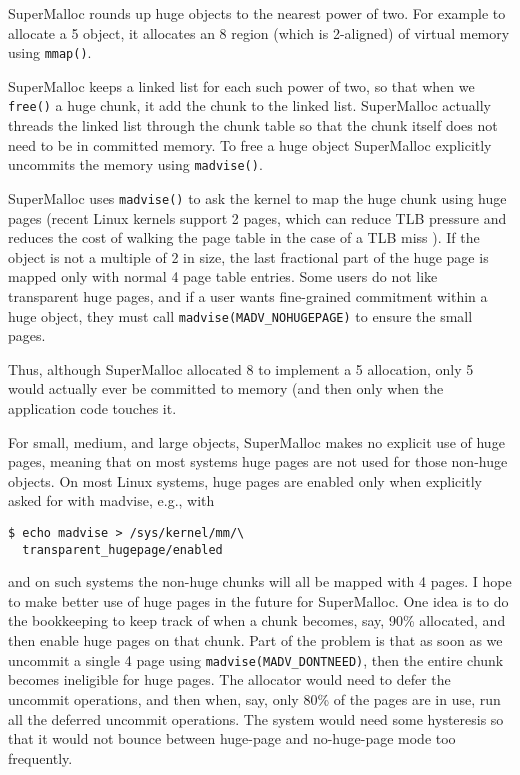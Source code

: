 \documentclass[natbib,sort&compress,10pt]{sigplanconf}
\newcommand{\code}[1]{\texttt{#1}}
\begin{document}
SuperMalloc rounds up huge objects to the nearest power of two.  For
example to allocate a \unit{5}\mebi\byte{} object, it allocates an
\unit{8}\mebi\byte{} region (which is \unit{2}\mebi\byte{}-aligned) of
virtual memory using \code{mmap()}.

SuperMalloc keeps a linked list for each such power of two, so that
when we \code{free()} a huge chunk, it add the chunk to the linked
list.  SuperMalloc actually threads the linked list through the chunk
table so that the chunk itself does not need to be in committed
memory.  To free a huge object SuperMalloc explicitly uncommits the
memory using \code{madvise()}.

SuperMalloc uses \code{madvise()} to ask the kernel to map the huge
chunk using huge pages (recent Linux kernels support
\unit{2}\mebi\byte{} pages, which can reduce TLB pressure and reduces
the cost of walking the page table in the case of a TLB miss
\cite{Corbet11}).  If the object is not a multiple of
\unit{2}\mebi\byte{} in size, the last fractional part of the huge
page is mapped only with normal \unit{4}\kibi\byte{} page table entries.
Some users do not like transparent huge pages, and if a user wants
fine-grained commitment within a huge object, they must call
\code{madvise(MADV\_NOHUGEPAGE)} to ensure the small pages.

Thus, although SuperMalloc allocated \unit{8}\mebi\byte{} to implement
a \unit{5}\mebi\byte{} allocation, only \unit{5}\mebi\byte{} would
actually ever be committed to memory (and then only when the
application code touches it.

For small, medium, and large objects, SuperMalloc makes no explicit
use of huge pages, meaning that on most systems huge pages are not
used for those non-huge objects.  On most Linux systems, huge pages are enabled
only when explicitly asked for with madvise, e.g., with
\begin{verbatim}
$ echo madvise > /sys/kernel/mm/\
  transparent_hugepage/enabled
\end{verbatim}
and on such systems the non-huge chunks will all be mapped with
\unit{4}\kibi\byte{} pages.  I hope to make better use of huge pages in
the future for SuperMalloc.  One idea is to do the bookkeeping to keep
track of when a chunk becomes, say, 90\% allocated, and then enable
huge pages on that chunk.  Part of the problem is that as soon as we
uncommit a single \unit{4}\kibi\byte{} page using
\code{madvise(MADV\_DONTNEED)}, then the entire chunk becomes
ineligible for huge pages.  The allocator would need to defer the
uncommit operations, and then when, say, only 80\% of the pages are in
use, run all the deferred uncommit operations.  The system would need
some hysteresis so that it would not bounce between huge-page and
no-huge-page mode too frequently.
\end{document}
